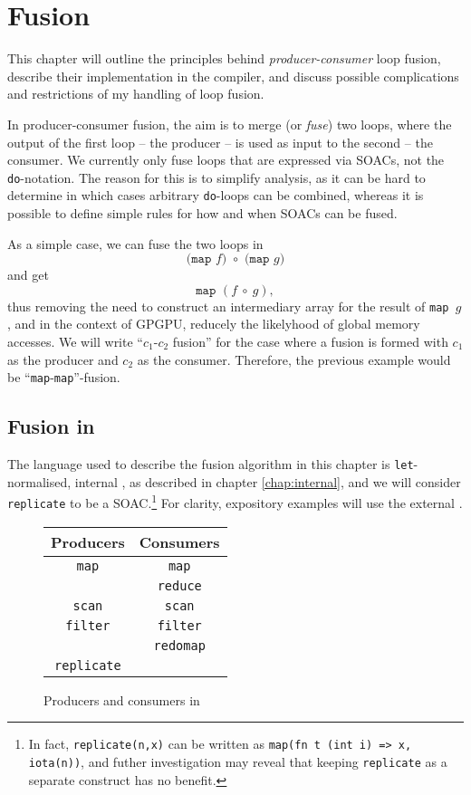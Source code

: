 \chapter{Fusion}
\label{chap:fusion}

This chapter will outline the principles behind
\textit{producer-consumer} loop fusion, describe their implementation
in the \LO{} compiler, and discuss possible complications and
restrictions of my handling of loop fusion.

In producer-consumer fusion, the aim is to merge (or \textit{fuse})
two loops, where the output of the first loop -- the producer -- is
used as input to the second -- the consumer.  We currently only fuse
loops that are expressed via SOACs, not the \texttt{do}-notation.  The
reason for this is to simplify analysis, as it can be hard to
determine in which cases arbitrary \texttt{do}-loops can be combined,
whereas it is possible to define simple rules for how and when SOACs
can be fused.

As a simple case, we can fuse the two loops in
\[
\texttt{(map~$f$)~$\circ$~(map~$g$)}
\]
and get
\[
\texttt{map~$(f~\circ~g)$},
\]
thus removing the need to construct an intermediary array for the
result of \texttt{map~$g$}, and in the context of GPGPU, reducely the
likelyhood of global memory accesses.  We will write ``$c_{1}$-$c_{2}$
fusion'' for the case where a fusion is formed with $c_{1}$ as the
producer and $c_{2}$ as the consumer.  Therefore, the previous example
would be ``\texttt{map}-\texttt{map}''-fusion.

\section{Fusion in \LO{}}

The language used to describe the fusion algorithm in this chapter is
\texttt{let}-normalised, internal \LO{}, as described in chapter
\ref{chap:internal}, and we will consider \texttt{replicate} to be a
SOAC.\footnote{In fact, \texttt{replicate(n,x)} can be written as
  \texttt{map(fn t (int i) => x, iota(n))}, and futher investigation
  may reveal that keeping \texttt{replicate} as a separate construct
  has no benefit.}  For clarity, expository examples will use the
external \LO{}.

\begin{figure}
  \begin{center}
    \begin{tabular}{c|c}
      \textbf{Producers} & \textbf{Consumers} \\\hline
      \texttt{map} & \texttt{map} \\\hline
      & \texttt{reduce} \\\hline
      \texttt{scan} & \texttt{scan} \\\hline
      \texttt{filter} & \texttt{filter} \\\hline
      & \texttt{redomap} \\\hline
      \texttt{replicate} & \\\hline
    \end{tabular}
  \end{center}
  \caption{Producers and consumers in \LO}
  \label{fig:producers-consumers}
\end{figure}

